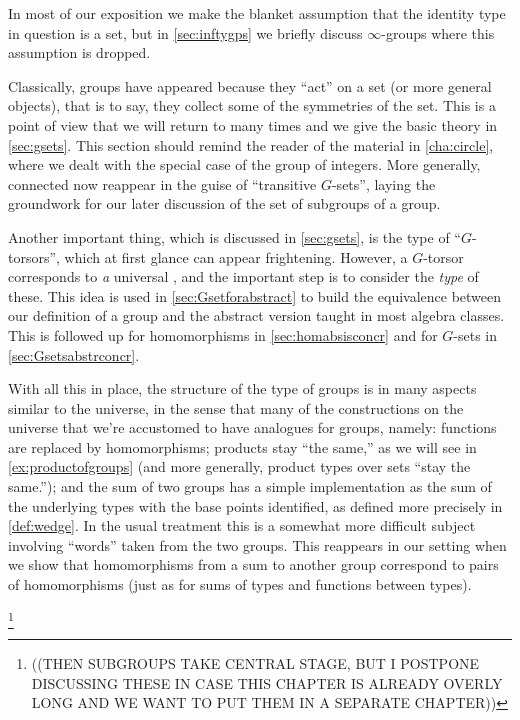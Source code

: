 In most of our exposition we make the blanket assumption that the identity type in question is a set, but in \cref{sec:inftygps} we briefly discuss $\infty$-groups where this assumption is dropped.

Classically, groups have appeared because they ``act'' on a set (or more general objects), that is to say, they collect some of the symmetries of the set.  This is a point of view that we will return to many times and we give the basic theory in \cref{sec:gsets}.
This section should remind the reader of the material in \cref{cha:circle}, where we dealt with the special case of the group of integers.
More generally, connected \coverings now reappear in the guise of ``transitive $G$-sets'', laying the groundwork for our later discussion of the set of subgroups of a group.

Another important thing, which is discussed in \cref{sec:gsets}, is the type of ``$G$-torsors'', which at first glance can appear frightening.
However, a $G$-torsor corresponds to \emph{a} universal \covering, and the important step is to consider the \emph{type} of these.
This idea is used in \cref{sec:Gsetforabstract} to build the equivalence between our definition of a group and the abstract version taught in most algebra classes.  This is followed up for homomorphisms in \cref{sec:homabsisconcr} and for $G$-sets in \cref{sec:Gsetsabstrconcr}.

With all this in place, the structure of the type of groups is in many aspects similar to the universe, in the sense that many of the constructions on the universe that we're accustomed to have analogues for groups, namely:
functions are replaced by homomorphisms;
products stay ``the same,'' as we will see in \cref{ex:productofgroups}
(and more generally, product types over sets ``stay the same.'');
and the sum of two groups has a simple implementation as the sum of the underlying types with the base points identified, as defined more precisely in \cref{def:wedge}.
In the usual treatment this is a somewhat more difficult subject involving ``words'' taken from the two groups.
This reappears in our setting when we show that homomorphisms
from a sum to another group
correspond to pairs of homomorphisms
(just as for sums of types and functions between types).

\footnote{((THEN SUBGROUPS TAKE CENTRAL STAGE, BUT I POSTPONE DISCUSSING THESE IN CASE THIS CHAPTER IS ALREADY OVERLY LONG AND WE WANT TO PUT THEM IN A SEPARATE CHAPTER))}




